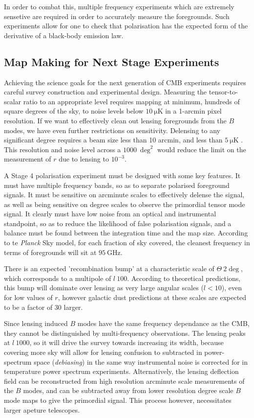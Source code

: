 {In order to combat this, multiple frequency experiments which are extremely sensetive are required in order to accurately measure the foregrounds. Such experiments allow for one to check that polarisation has the expected form of the derivative of a black-body emission law.

\subsection{Map Making for Next Stage Experiments}
Achieving the science goals for the next generation of CMB experiments requires careful survey construction and experimental design. Measuring the tensor-to-scalar ratio to an appropriate level requires mapping at minimum, hundreds of square degrees of the sky, to noise levels below $\SI{10}{\micro\kelvin}$ in a 1-arcmin pixel resolution. If we want to effectively clean out lensing foregrounds from the $B$ modes, we have even further restrictions on sensitivity. Delensing to any significant degree requires a beam size less than 10 arcmin, and less than $\SI{5}{\micro\kelvin}$ \cite{0811.3915}. This resolution and noise level across a $\SI{1000}{\deg^2}$ would reduce the limit on the measurement of $r$ due to lensing to $10^{-3}$.

\par A Stage 4 polarisation experiment must be designed with some key features. It must have multiple frequency bands, so as to separate polarised foreground signals. It must be sensitive on arcminute scales to effectively delense the signal, as well as being sensitive on degree scales to observe the primordial tensor mode signal. It clearly must have low noise from an optical and instrumental standpoint, so as to reduce the likelihood of false polarisation signals, and a balance must be found between the integration time and the map size. According to te \textit{Planck} Sky model, for each fraction of sky covered, the cleanest frequency in terms of foregrounds will sit at $\SI{95}{\giga\hertz}$.

\par There is an expected 'recombination bump' at a characteristic scale of $\Theta ~ 2\deg$, which corresponds to a multipole of $l ~ 100$. According to theoretical predictions, this bump will dominate over lensing as very large angular scales ($l<10$), even for low values of $r$, however galactic dust predictions at these scales are expected to be a factor of 30 larger.

\par Since lensing induced $B$ modes have the same frequency dependance as the CMB, they cannot be distinguished by multi-frequency observations. The lensing peaks at $l ~1000$, so it will drive the survey towards increasing its width, because covering more sky will allow for lensing confusion to subtracted in power-spectrum space (\textit{debiasing}) in the same way instrumental noise is corrected for in temperature power spectrum experiments. Alternatively, the lensing deflection field can be reconstructed from high resolution arcminute scale measurements of the $B$ modes, and can be subtracted away from lower resolution degree scale $B$ mode maps to give the primordial signal. This process however, necessitates larger apeture telescopes.

}
